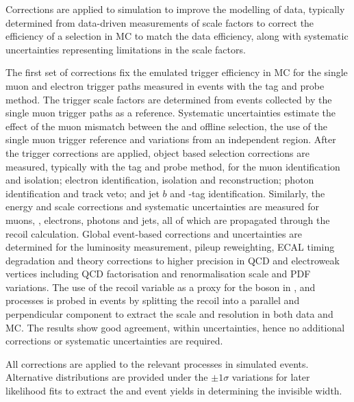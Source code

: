 Corrections are applied to simulation to improve the modelling of data,
typically determined from data-driven measurements of scale factors to correct
the efficiency of a selection in MC to match the data efficiency, along with
systematic uncertainties representing limitations in the scale factors.

The first set of corrections fix the emulated trigger efficiency in MC for
the single muon and electron trigger paths measured in \IDYll events with the
tag and probe method. The \ptmiss trigger scale factors are determined from events collected by the single muon
trigger paths as a reference. Systematic uncertainties estimate the effect of
the muon mismatch between the \SWT and offline selection, the use of the
single muon trigger reference and variations from an independent region. After
the trigger corrections are applied, object based selection corrections are
measured, typically with the tag and probe method, for the muon identification
and isolation; electron identification, isolation and reconstruction; photon
identification and track veto; and jet $b$ and \Ptauh-tag identification.
Similarly, the energy and \pt scale corrections and systematic uncertainties
are measured for muons, \Ptauh, electrons, photons and jets, all of which are
propagated through the recoil calculation. Global event-based corrections and
uncertainties are determined for the luminosity measurement, pileup
reweighting, ECAL timing degradation and theory corrections to higher
precision in QCD and electroweak vertices including QCD factorisation and
renormalisation scale and PDF variations. The use of the recoil variable as a
proxy for the boson \pt in \IZvvj, \IWlvj and \IDYllj processes is probed in
\IDYllj events by splitting the recoil into a parallel and perpendicular
component to extract the scale and resolution in both data and MC. The results
show good agreement, within uncertainties, hence no additional corrections
or systematic uncertainties are required.

All corrections are applied to the relevant processes in simulated events. Alternative distributions are provided under the $\pm 1\sigma$ variations for later likelihood fits to extract the \IZvvj and \IZllj event yields in determining the \PZ invisible width.